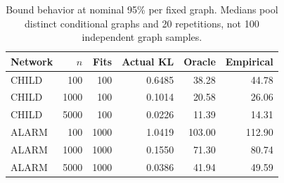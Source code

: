\begin{table}[tbp]\centering
\caption{Bound behavior at nominal 95\% per fixed graph. Medians pool distinct conditional graphs and 20 repetitions, not 100 independent graph samples.}\label{tab:new-bounds}
\begin{tabular}{lrrrrr}
\toprule
Network & $n$ & Fits & Actual KL & Oracle & Empirical\\
\midrule
CHILD & 100 & 100 & 0.6485 & 38.28 & 44.78\\
CHILD & 1000 & 100 & 0.1014 & 20.58 & 26.06\\
CHILD & 5000 & 100 & 0.0226 & 11.39 & 14.31\\
ALARM & 100 & 1000 & 1.0419 & 103.00 & 112.90\\
ALARM & 1000 & 1000 & 0.1550 & 71.30 & 80.74\\
ALARM & 5000 & 1000 & 0.0386 & 41.94 & 49.59\\
\bottomrule\end{tabular}\end{table}
